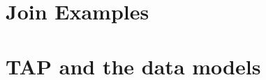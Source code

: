 \documentclass[11pt,a4paper]{ivoa}
\begin{document}
\section{Join Examples}\label{appen_join}


\section{TAP and the data models}\label{appen_votable}





\end{document}
